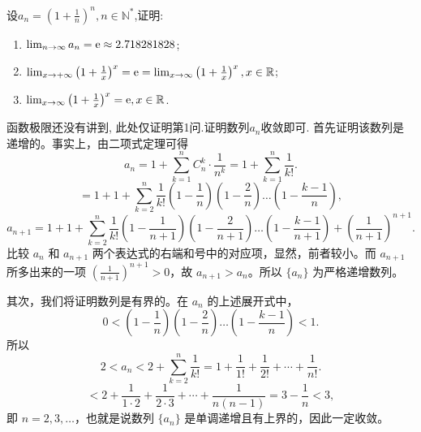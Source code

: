 \begin{example}\label{example:e_n}
    设$a_n= \left(1+ \frac 1n \right)^n , n \in \mathbb{N}^*$,证明:
    \begin{enumerate}
        \item $\lim_{n \to \infty} a_n = \mathrm{e} \approx 2.718281828$;
        \item $\lim_{x\to  +\infty } \left( 1 +\frac 1x \right)^x = \mathrm{e} = \lim_{x \to  \infty } \left(1 +\frac 1x \right)^x,x \in \mathbb R $;
        \item $\lim_{x \to \infty} \left(1 +\frac 1x \right)^x = \mathrm{e}, x \in \mathbb R$.
    \end{enumerate}

    \begin{solution}
        函数极限还没有讲到, 此处仅证明第1问.证明数列$a_n$收敛即可.
        首先证明该数列是递增的。事实上，由二项式定理可得
        $$
            a_n = 1 + \sum_{k=1}^{n} C_n^k \cdot \frac{1}{n^k} = 1 + \sum_{k=1}^{n} \frac{1}{k!}.
        $$
        $$
            = 1 + 1 + \sum_{k=2}^{n} \frac{1}{k!} \left( 1 - \frac{1}{n} \right) \left( 1 - \frac{2}{n} \right) \dots \left( 1 - \frac{k-1}{n} \right),
        $$
        $$
            a_{n+1} = 1 + 1 + \sum_{k=2}^{n} \frac{1}{k!} \left( 1 - \frac{1}{n+1} \right) \left( 1 - \frac{2}{n+1} \right) \dots \left( 1 - \frac{k-1}{n+1} \right) + \left( \frac{1}{n+1} \right)^{n+1}.
        $$
        比较 $a_n$ 和 $a_{n+1}$ 两个表达式的右端和号中的对应项，显然，前者较小。而 $a_{n+1}$ 所多出来的一项 $\left( \frac{1}{n+1} \right)^{n+1} > 0$，故 $a_{n+1} > a_n$。所以 $\{a_n\}$ 为严格递增数列。

        其次，我们将证明数列是有界的。在 $a_n$ 的上述展开式中，
        $$
            0 < \left( 1 - \frac{1}{n} \right) \left( 1 - \frac{2}{n} \right) \dots \left( 1 - \frac{k-1}{n} \right) < 1.
        $$
        所以
        $$
            2 < a_n < 2 + \sum_{k=2}^{n} \frac{1}{k!} = 1 + \frac{1}{1!} + \frac{1}{2!} + \cdots + \frac{1}{n!}.
        $$
        $$
            < 2 + \frac{1}{1 \cdot 2} + \frac{1}{2 \cdot 3} + \cdots + \frac{1}{n(n-1)} = 3 - \frac{1}{n} < 3,
        $$
        即 $n = 2, 3, \dots$，也就是说数列 $\{a_n\}$ 是单调递增且有上界的，因此一定收敛。
    \end{solution}

\end{example}


